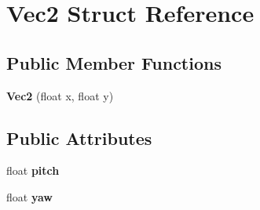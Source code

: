 \hypertarget{struct_vec2}{}\section{Vec2 Struct Reference}
\label{struct_vec2}
\subsection*{Public Member Functions}
\begin{DoxyCompactItemize}
\item 
\mbox{\label{struct_vec2_a6256fecebf5a43b14d5d5341c58cfdc4}} 
{\bfseries Vec2} (float x, float y)
\end{DoxyCompactItemize}
\subsection*{Public Attributes}
\begin{DoxyCompactItemize}
\item 
\mbox{\label{struct_vec2_a7e87fc1a532d75dd2291a0088766390b}} 
float {\bfseries pitch}
\item 
\mbox{\label{struct_vec2_aac04e59673a7c6f00ceb5c1a61e85ff8}} 
float {\bfseries yaw}
\end{DoxyCompactItemize}
